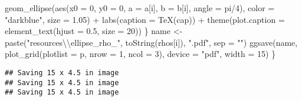 \documentclass[
]{article}
\newenvironment{Shaded}{\begin{snugshade}}{\end{snugshade}}
\newcommand{\AttributeTok}[1]{\textcolor[rgb]{0.77,0.63,0.00}{#1}}
\newcommand{\DecValTok}[1]{\textcolor[rgb]{0.00,0.00,0.81}{#1}}
\newcommand{\FloatTok}[1]{\textcolor[rgb]{0.00,0.00,0.81}{#1}}
\newcommand{\FunctionTok}[1]{\textcolor[rgb]{0.00,0.00,0.00}{#1}}
\newcommand{\NormalTok}[1]{#1}
\newcommand{\OtherTok}[1]{\textcolor[rgb]{0.56,0.35,0.01}{#1}}
\newcommand{\SpecialCharTok}[1]{\textcolor[rgb]{0.00,0.00,0.00}{#1}}
\newcommand{\StringTok}[1]{\textcolor[rgb]{0.31,0.60,0.02}{#1}}
\begin{document}
\begin{Shaded}
\begin{Highlighting}[]
            \FunctionTok{geom\_ellipse}\NormalTok{(}\FunctionTok{aes}\NormalTok{(}\AttributeTok{x0 =} \DecValTok{0}\NormalTok{, }\AttributeTok{y0 =} \DecValTok{0}\NormalTok{, }\AttributeTok{a =}\NormalTok{ a[i], }\AttributeTok{b =}\NormalTok{ b[i], }\AttributeTok{angle =}\NormalTok{ pi}\SpecialCharTok{/}\DecValTok{4}\NormalTok{), }\AttributeTok{color =} \StringTok{"darkblue"}\NormalTok{, }
                \AttributeTok{size =} \FloatTok{1.05}\NormalTok{) }\SpecialCharTok{+} \FunctionTok{labs}\NormalTok{(}\AttributeTok{caption =} \FunctionTok{TeX}\NormalTok{(cap)) }\SpecialCharTok{+} \FunctionTok{theme}\NormalTok{(}\AttributeTok{plot.caption =} \FunctionTok{element\_text}\NormalTok{(}\AttributeTok{hjust =} \FloatTok{0.5}\NormalTok{, }
            \AttributeTok{size =} \DecValTok{20}\NormalTok{))}
\NormalTok{    \}}
\NormalTok{    name }\OtherTok{\textless{}{-}} \FunctionTok{paste}\NormalTok{(}\StringTok{"resources}\SpecialCharTok{\textbackslash{}\textbackslash{}}\StringTok{ellipse\_rho\_"}\NormalTok{, }\FunctionTok{toString}\NormalTok{(rhos[i]), }\StringTok{".pdf"}\NormalTok{, }\AttributeTok{sep =} \StringTok{""}\NormalTok{)}
    \FunctionTok{ggsave}\NormalTok{(name, }\FunctionTok{plot\_grid}\NormalTok{(}\AttributeTok{plotlist =}\NormalTok{ p, }\AttributeTok{nrow =} \DecValTok{1}\NormalTok{, }\AttributeTok{ncol =} \DecValTok{3}\NormalTok{), }\AttributeTok{device =} \StringTok{"pdf"}\NormalTok{, }\AttributeTok{width =} \DecValTok{15}\NormalTok{)}
\NormalTok{\}}
\end{Highlighting}
\end{Shaded}

\begin{verbatim}
## Saving 15 x 4.5 in image
## Saving 15 x 4.5 in image
## Saving 15 x 4.5 in image
\end{verbatim}
\end{document}
